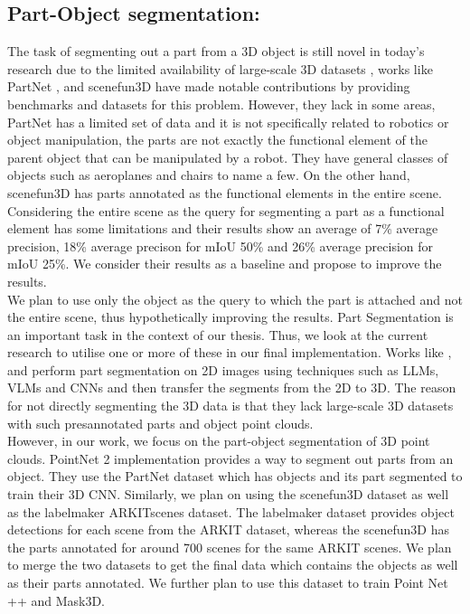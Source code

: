  \subsection{Part-Object segmentation:}
The task of segmenting out a part from a 3D object is still novel in today's research due to the limited availability of large-scale 3D datasets
, works like PartNet \cite{Mo_2019_CVPR}, and scenefun3D \cite{delitzas2024scenefun3d} have made notable contributions by providing benchmarks and datasets for this problem. 
However, they lack in some areas, PartNet has a limited set of data and it is not specifically related to robotics or object manipulation, the parts are not
exactly the functional element of the parent object that can be manipulated by a robot. They have general
classes of objects such as aeroplanes and chairs to name a few. On the other hand, scenefun3D has parts annotated as the functional elements in the entire scene. Considering
the entire scene as the query for segmenting a part as a functional element has some limitations and their results show an average of 7\% average precision, 18\% average precison for mIoU 
50\% and 26\% average precision for mIoU 25\%. We consider their results as a baseline and propose to improve the results. \\
We plan to use only the object as the query to which the part is attached and not the entire scene, thus hypothetically improving the results.
Part Segmentation is an important task in the context of our thesis. Thus, we look at the current research to utilise one or more of these
in our final implementation. Works like \cite{Liu_2023_CVPR}, and \cite{10.1007/978-3-031-72652-1_25} perform part segmentation on 2D images using techniques such as LLMs, VLMs and CNNs and then transfer the 
segments from the 2D to 3D. The reason for not directly segmenting the 3D data is that they lack large-scale 3D datasets with such presannotated parts
and object point clouds. \\
However, in our work, we focus on the part-object segmentation of 3D point clouds. PointNet 2 implementation provides a way to segment out parts from an object. 
They use the PartNet dataset which has objects and its part segmented to train their 3D CNN. Similarly, we plan on using the scenefun3D dataset as well as 
the labelmaker ARKITscenes dataset. The labelmaker dataset provides object detections for each scene from the ARKIT dataset, whereas the scenefun3D has
the parts annotated for around 700 scenes for the same ARKIT scenes. We plan to merge the two datasets to get the final data which contains the objects as 
well as their parts annotated. We further plan to use this dataset to train Point Net ++ and Mask3D.
